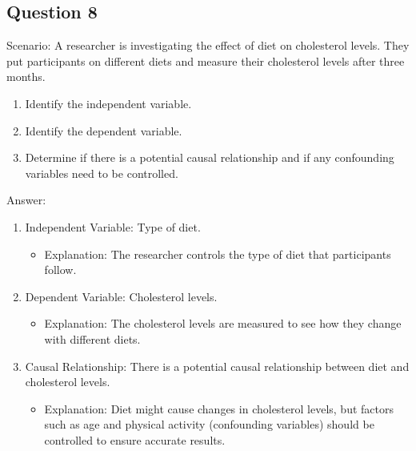 \documentclass[
  letterpaper,
  DIV=11,
  numbers=noendperiod]{scrreprt}
\providecommand{\tightlist}{%
  \setlength{\itemsep}{0pt}\setlength{\parskip}{0pt}}\usepackage{longtable,booktabs,array}
\begin{document}
\subsection*{Question 8}\label{question-8}

Scenario: A researcher is investigating the effect of diet on
cholesterol levels. They put participants on different diets and measure
their cholesterol levels after three months.

\begin{enumerate}
\def\labelenumi{\arabic{enumi}.}
\tightlist
\item
  Identify the independent variable.
\item
  Identify the dependent variable.
\item
  Determine if there is a potential causal relationship and if any
  confounding variables need to be controlled.
\end{enumerate}

Answer:

\begin{enumerate}
\def\labelenumi{\arabic{enumi}.}
\tightlist
\item
  Independent Variable: Type of diet.

  \begin{itemize}
  \tightlist
  \item
    Explanation: The researcher controls the type of diet that
    participants follow.
  \end{itemize}
\item
  Dependent Variable: Cholesterol levels.

  \begin{itemize}
  \tightlist
  \item
    Explanation: The cholesterol levels are measured to see how they
    change with different diets.
  \end{itemize}
\item
  Causal Relationship: There is a potential causal relationship between
  diet and cholesterol levels.

  \begin{itemize}
  \tightlist
  \item
    Explanation: Diet might cause changes in cholesterol levels, but
    factors such as age and physical activity (confounding variables)
    should be controlled to ensure accurate results.
  \end{itemize}
\end{enumerate}
\end{document}
